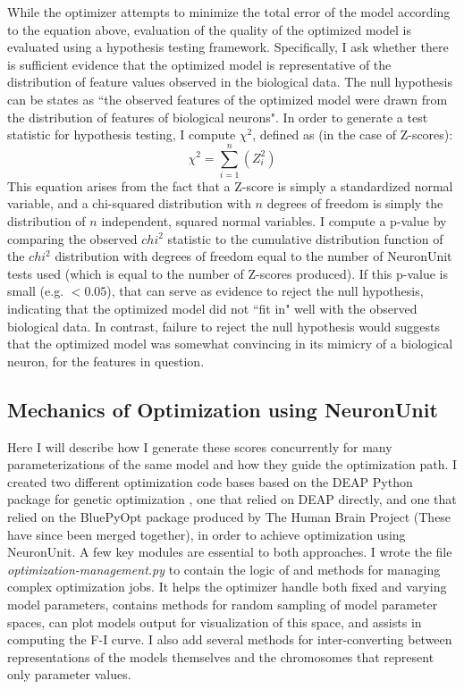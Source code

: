 While the optimizer attempts to minimize the total error of the model according to the equation above, evaluation of the quality of the optimized model is evaluated using a hypothesis testing framework.
Specifically, I ask whether there is sufficient evidence that the optimized model is representative of the distribution of feature values observed in the biological data.
The null hypothesis can be states as ``the observed features of the optimized model were drawn from the distribution of features of biological neurons".
In order to generate a test statistic for hypothesis testing, I compute $\chi^{2}$, defined as (in the case of Z-scores):
\begin{equation}
\chi^{2}=\sum\limits_{i=1}^{n}(Z_{i}^{2})
\end{equation}
This equation arises from the fact that a Z-score is simply a standardized normal variable, and a chi-squared distribution with $n$ degrees of freedom is simply the distribution of $n$ independent, squared normal variables.
I compute a p-value by comparing the observed $chi^2$ statistic to the cumulative distribution function of the $chi^2$ distribution with degrees of freedom equal to the number of NeuronUnit tests used (which is equal to the number of Z-scores produced).
If this p-value is small (e.g. $<0.05$), that can serve as evidence to reject the null hypothesis, indicating that the optimized model did not ``fit in" well with the observed biological data.
In contrast, failure to reject the null hypothesis would suggests that the optimized model was somewhat convincing in its mimicry of a biological neuron, for the features in question.

\subsection{Mechanics of Optimization using NeuronUnit}
Here I will describe how I generate these scores concurrently for many parameterizations of the same model and how they guide the optimization path.
I created two different optimization code bases based on the DEAP Python package for genetic optimization \citep{DEAP_JMLR2012}, one that relied on DEAP directly, and one that relied on the BluePyOpt package produced by The Human Brain Project \citep{bluepyopt} (These have since been merged together), in order to achieve optimization using NeuronUnit.
A few key modules are essential to both approaches.
I wrote the file \emph{optimization-management.py} to contain the logic of and methods for managing complex optimization jobs.
It helps the optimizer handle both fixed and varying  model parameters, contains methods for random sampling of model parameter spaces, can plot models output for visualization of this space, and assists in computing the F-I curve.
I also add several methods for inter-converting between representations of the models themselves and the chromosomes that represent only parameter values.


